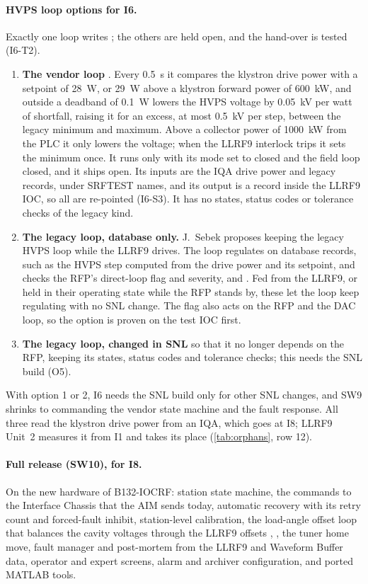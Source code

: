 \paragraph{HVPS loop options for I6.} Exactly one loop writes
; the others are held open, and the hand-over is tested
(I6-T2).
\begin{enumerate}
\item \textbf{The vendor loop} . Every \qty{0.5}{\second} it compares the
klystron drive power with a setpoint of \qty{28}{\watt}, or \qty{29}{\watt} above a
klystron forward power of \qty{600}{\kilo\watt}, and outside a deadband of
\qty{0.1}{\watt} lowers the HVPS voltage by \qty{0.05}{\kilo\volt} per watt of
shortfall, raising it for an excess, at most \qty{0.5}{\kilo\volt} per step, between
the legacy minimum and maximum. Above a collector power of \qty{1000}{\kilo\watt} from
the PLC it only lowers the voltage; when the LLRF9 interlock trips it sets the minimum
once. It runs only with its mode set to closed and the field loop closed, and it
ships open. Its inputs are the IQA drive power and legacy records, under SRFTEST
names, and its output is a record inside the LLRF9 IOC, so all are re-pointed
(I6-S3). It has no states, status codes or tolerance checks of the legacy kind.
\item \textbf{The legacy loop, database only.} J.~Sebek proposes keeping the legacy
HVPS loop while the LLRF9 drives. The loop regulates on database records, such as the
HVPS step  computed from the drive power and its
setpoint, and checks the RFP's direct-loop flag and severity,
 and  . Fed from the
LLRF9, or held in their operating state while the RFP stands by, these let the loop
keep regulating with no SNL change. The flag also acts on the RFP and the DAC loop, so
the option is proven on the test IOC first.
\item \textbf{The legacy loop, changed in SNL} so that it no longer depends on the RFP,
keeping its states, status codes and tolerance checks; this needs the SNL build (O5).
\end{enumerate}
With option 1 or 2, I6 needs the SNL build only for other SNL changes, and SW9 shrinks
to commanding the vendor state machine and the fault response. All three read the
klystron drive power from an IQA, which goes at I8; LLRF9 Unit~2 measures it from I1
and takes its place (\cref{tab:orphans}, row 12).

\paragraph{Full release (SW10), for I8.} On the new hardware of \mbox{B132-IOCRF}:
station state machine, the commands to the Interface Chassis that the AIM sends today,
automatic recovery with its retry count and forced-fault
inhibit, station-level calibration, the load-angle offset loop that balances the
cavity voltages through the LLRF9 offsets , , the tuner home move, fault
manager and
post-mortem from the LLRF9 and Waveform Buffer data, operator and expert screens,
alarm and archiver configuration, and ported MATLAB tools.

